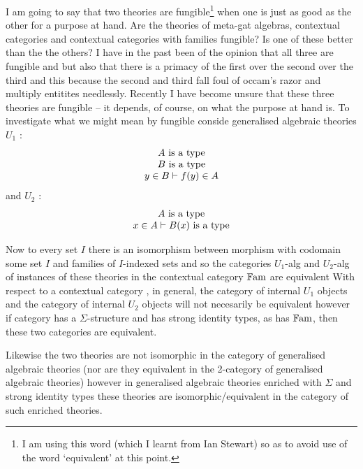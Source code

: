 

\note {} I am going to say that two theories are fungible\footnote{I am using this word (which I learnt from Ian Stewart) so as to avoid use of the word `equivalent' at this point.} when one is just as good as the other for a purpose at hand.
\note 
Are the theories of meta-gat algebras, contextual categories and contextual categories with families fungible? Is one of these better than the the others? I have in the past been of the opinion that all three are fungible and but also that there is a primacy of the  first over the second over the third and this because the second and third fall foul of occam's razor and multiply entitites needlessly.  Recently I have become unsure that these three theories are fungible -- it depends, of course, on what the purpose at hand is.
\note
To investigate what we might mean by fungible conside generalised algebraic theories $U_1$ :
\begin{equation*}
\label{tmorphism}
\begin{array}{c}
A\mbox{ is a type} \\
B\mbox{ is a type} \\
y \in B \vdash f(y) \in A
\end{array}
\end{equation*}
and $U_2$ :
\begin{equation*}
\label{tfamily}
\begin{array}{c}
A\mbox{ is a type} \\
x \in A \vdash B(x)\mbox{ is a type} \\
\end{array}
\end{equation*}

Now to every set $I$ there is an isomorphism between morphism with codomain some set $I$ and families of $I$-indexed sets
and so the categories $U_1$-alg and $U_2$-alg of instances of these theories in the contextual category $\mathbb{F\mathrm{am}} $ are equivalent 
 With respect to a contextual category \catcw, in general, the category of internal $U_1$ objects and the category of internal  $U_2$ objects will not necesarily be equivalent however if category 
\catcw has a $\Sigma$-structure and has strong identity types, as has $\mathbb{F\mathrm{am}} $, then these two categories are equivalent.  

Likewise the two theories are not isomorphic in the category of generalised algebraic theories (nor are they equivalent 
in the 2-category of generalised algebraic theories)  however in generalised algebraic theories enriched with $\Sigma$
and strong identity types these theories are isomorphic/equivalent in the category
of such enriched theories.

